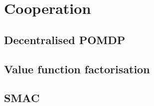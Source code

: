 \chapter{Cooperation}\label{ch:cooperation}

\section{Decentralised POMDP}
\section{Value function factorisation}
\section{SMAC}

